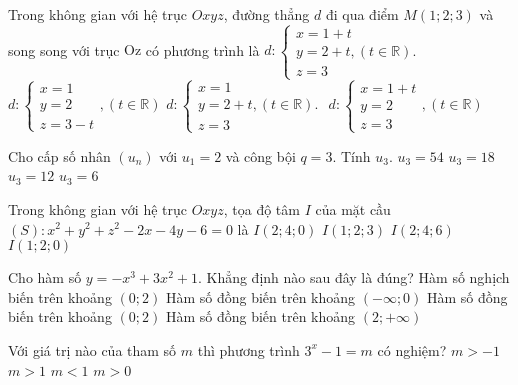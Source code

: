 \begin{ex} %
 Trong không gian với hệ trục $O x y z$, đường thẳng $d$ đi qua điểm $M(1; 2; 3)$ và song song với trục $\mathrm{Oz}$ có phương trình là
\choice
{$d:\left\{\begin{array}{l}x=1+t \\ y=2+t,(t \in \mathbb{R}). \\ z=3\end{array}\right.$}
{\True $d:\left\{\begin{array}{l}x=1 \\ y=2 \\ z=3- t\end{array},(t \in \mathbb{R})\right.$}
{$d:\left\{\begin{array}{l}x=1 \\ y=2+t,(t \in \mathbb{R}). \\ z=3\end{array}\right.$}
{$d:\left\{\begin{array}{l}x=1+ t \\ y=2 \\ z=3\end{array},(t \in \mathbb{R})\right.$}
\end{ex}

\begin{ex} %
 Cho cấp số nhân $\left(u_{n}\right)$ với $u_{1}=2$ và công bội $q=3$. Tính $u_{3}$.
\choice
{$u_{3}=54$}
{\True $u_{3}=18$}
{$u_{3}=12$}
{$u_{3}=6$}
\end{ex}

\begin{ex}%
 Trong không gian với hệ trục $O x y z$, tọa độ tâm $I$ của mặt cầu $(S): x^{2}+y^{2}+z^{2}-2 x-4 y-6=0$ là
\choice
{$I(2; 4; 0)$}
{$I(1; 2; 3)$}
{$I(2; 4; 6)$}
{\True$I(1; 2; 0)$}
\end{ex}

\begin{ex} %
 Cho hàm số $y=-x^{3}+3 x^{2}+1$. Khẳng định nào sau đây là đúng?
\choice
{Hàm số nghịch biến trên khoảng $(0; 2)$}
{Hàm số đồng biến trên khoảng $(-\infty; 0)$}
{\True Hàm số đồng biến trên khoảng $(0; 2)$}
{Hàm số đồng biến trên khoảng $(2;+\infty)$}
\end{ex}

\begin{ex} %
 Với giá trị nào của tham số $m$ thì phương trình $3^{x}-1=m$ có nghiệm?
\choice
{\True $m>-1$}
{$m>1$}
{$m<1$}
{$m>0$}
\end{ex}


